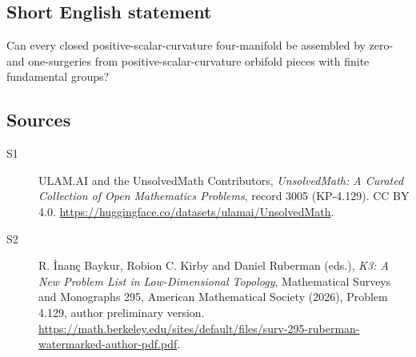 \documentclass[11pt]{article}
\begin{document}
\subsection{Short English statement}
Can every closed positive-scalar-curvature four-manifold be assembled by zero- and one-surgeries from positive-scalar-curvature orbifold pieces with finite fundamental groups?
\subsection{Sources}
\begin{description}
\item[\hypertarget{source:3005:1}{S1}] ULAM.AI and the UnsolvedMath Contributors, \emph{UnsolvedMath: A Curated Collection of Open Mathematics Problems}, record 3005 (KP-4.129). CC BY 4.0. \url{https://huggingface.co/datasets/ulamai/UnsolvedMath}.
\item[\hypertarget{source:3005:2}{S2}] R. İnanç Baykur, Robion C. Kirby and Daniel Ruberman (eds.), \emph{K3: A New Problem List in Low-Dimensional Topology}, Mathematical Surveys and Monographs 295, American Mathematical Society (2026), Problem 4.129, author preliminary version. \url{https://math.berkeley.edu/sites/default/files/surv-295-ruberman-watermarked-author-pdf.pdf}.
\end{description}
\label{end:3005}
\end{document}
